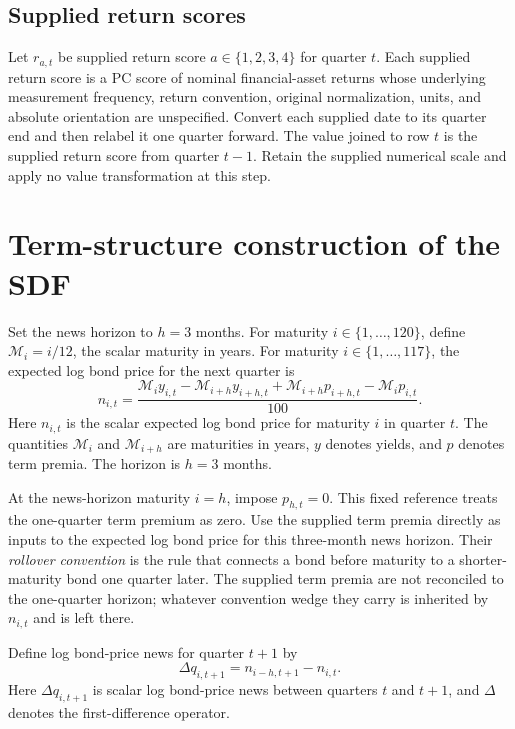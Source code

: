 \documentclass[11pt]{article}
\begin{document}
\subsection{Supplied return scores}

Let \(r_{a,t}\) be supplied return score \(a\in\{1,2,3,4\}\) for quarter \(t\). Each supplied
return score is a PC score of nominal financial-asset returns whose underlying measurement
frequency, return convention, original normalization, units, and absolute orientation are unspecified.
Convert each supplied date to its quarter end and then relabel it one quarter forward. The value
joined to row \(t\) is the supplied return score from quarter \(t-1\). Retain the supplied numerical
scale and apply no value transformation at this step.

\section{Term-structure construction of the SDF}
\label{sec:sdf}

Set the news horizon to \(h=3\) months. For maturity \(i\in\{1,\ldots,120\}\), define
\(\mathcal M_i=i/12\), the scalar maturity in years. For maturity \(i\in\{1,\ldots,117\}\), the
expected log bond price for the next quarter is
\begin{equation}
 n_{i,t}=\frac{\mathcal M_i y_{i,t}-\mathcal M_{i+h}y_{i+h,t}
       +\mathcal M_{i+h}p_{i+h,t}-\mathcal M_i p_{i,t}}{100}.
 \label{eq:nhat}
\end{equation}
Here \(n_{i,t}\) is the scalar expected log bond price for maturity \(i\) in quarter \(t\).
The quantities \(\mathcal M_i\) and \(\mathcal M_{i+h}\) are maturities in years, \(y\) denotes
yields, and \(p\) denotes term premia. The horizon is \(h=3\) months.

At the news-horizon maturity \(i=h\), impose \(p_{h,t}=0\). This fixed reference treats the
one-quarter term premium as zero.
Use the supplied term premia directly as inputs to the expected log bond price for this
three-month news horizon. Their \emph{rollover convention} is the rule that connects a bond before
maturity to a shorter-maturity bond one quarter later. The supplied term premia are not reconciled to
the one-quarter horizon; whatever convention wedge they carry is inherited by \(n_{i,t}\) and is left
there.

Define log bond-price news for quarter \(t+1\) by
\begin{equation*}
 \Delta q_{i,t+1}=n_{i-h,t+1}-n_{i,t}.
\end{equation*}
Here \(\Delta q_{i,t+1}\) is scalar log bond-price news between quarters \(t\) and \(t+1\), and
\(\Delta\) denotes the first-difference operator.
\end{document}
